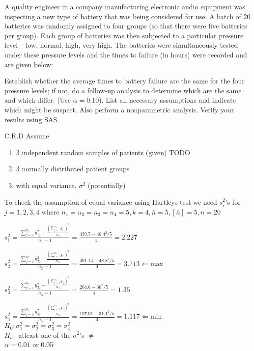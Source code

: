 \documentclass{article}
\begin{document}
A quality engineer in a company manufacturing electronic audio equipment was inspecting
 a new type of battery that was being considered for use. A batch of 20 batteries was
 randomly assigned to four groups (so that there were five batteries per group). Each group
 of batteries was then subjected to a particular pressure level – low, normal, high, very
 high. The batteries were simultaneously tested under these pressure levels and the times
 to failure (in hours) were recorded and are given below: 

Establish whether the average times to battery failure are the same for the four pressure levels;
if not, do a follow-up analysis to determine which are the same and which differ. (Use $\alpha =0.10$).
List all necessary assumptions and indicate which might be suspect. Also perform a nonparametric analysis. Verify your results using SAS. 

C.R.D
Assume 
\begin{enumerate}[1)]
\item 3 independent random samples of patients (given) TODO
\item 3 normally distributed patient groups
\item with equal variance, $\sigma^2$ (potentially)
\end{enumerate}

To check the assumption of equal variance using Hartleys test we need $s_i^2$'s for $j = 1,2,3, 4$ where $n_1 = n_2 = n_3 = n_4 = 5, k = 4, \bar{n} = 5, [\bar{n}] = 5, n = 20$

$s_1^2 = \frac{
\sum_{j=1}^{n_1} {y_{1j}^2} - \frac{ (\sum_{j=1}^{n_1}{y_{1j}})^2}{n_1}
}{
n_1 - 1
}
=
\frac{
439.5 - 46.4^2 / 5
}{4}
= 2.227
$


$s_2^2 = \frac{
\sum_{j=1}^{n_2} {y_{2j}^2} - \frac{ (\sum_{j=1}^{n_2}{y_{2j}})^2}{n_2}
}{
n_2 - 1
}
=
\frac{
491.14 - 48.8^2 / 5
}{4}
= 3.713 \Leftarrow \text{max}
$

$s_3^2 = \frac{
\sum_{j=1}^{n_3} {y_{3j}^2} - \frac{ (\sum_{j=1}^{n_3}{y_{3j}})^2}{n_3}
}{
n_3 - 1
}
=
\frac{
264.6 - 36^2 / 5
}{4}
= 1.35
$


$s_4^2 = \frac{
\sum_{j=1}^{n_4} {y_{4j}^2} - \frac{ (\sum_{j=1}^{n_4}{y_{4j}})^2}{n_4}
}{
n_4 - 1
}
=
\frac{
197.91 - 31.1^2 / 5
}{4}
= 1.117 \Leftarrow \text{min}
$ \\


$H_0: \sigma_1^2 = \sigma_2^2 = \sigma_3^2 = \sigma_4^2$ \\
$H_a:$ atleast one of the $\sigma^2$'s $\neq $\\
$ \alpha = 0.01$ or 0.05
\end{document}
